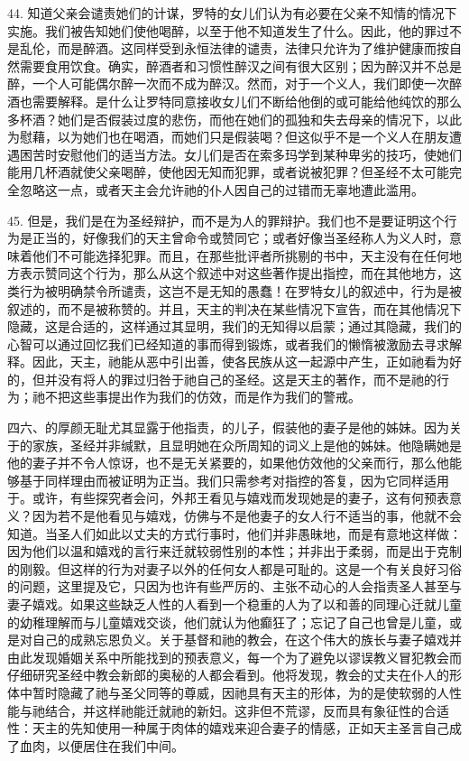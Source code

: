 44. 知道父亲会谴责她们的计谋，罗特的女儿们认为有必要在父亲不知情的情况下实施。我们被告知她们使他喝醉，以至于他不知道发生了什么。因此，他的罪过不是乱伦，而是醉酒。这同样受到永恒法律的谴责，法律只允许为了维护健康而按自然需要食用饮食。确实，醉酒者和习惯性醉汉之间有很大区别；因为醉汉并不总是醉，一个人可能偶尔醉一次而不成为醉汉。然而，对于一个义人，我们即使一次醉酒也需要解释。是什么让罗特同意接收女儿们不断给他倒的或可能给他纯饮的那么多杯酒？她们是否假装过度的悲伤，而他在她们的孤独和失去母亲的情况下，以此为慰藉，以为她们也在喝酒，而她们只是假装喝？但这似乎不是一个义人在朋友遭遇困苦时安慰他们的适当方法。女儿们是否在索多玛学到某种卑劣的技巧，使她们能用几杯酒就使父亲喝醉，使他因无知而犯罪，或者说被犯罪？但圣经不太可能完全忽略这一点，或者天主会允许祂的仆人因自己的过错而无辜地遭此滥用。\par

45. 但是，我们是在为圣经辩护，而不是为人的罪辩护。我们也不是要证明这个行为是正当的，好像我们的天主曾命令或赞同它；或者好像当圣经称人为义人时，意味着他们不可能选择犯罪。而且，在那些批评者所挑剔的书中，天主没有在任何地方表示赞同这个行为，那么从这个叙述中对这些著作提出指控，而在其他地方，这类行为被明确禁令所谴责，这岂不是无知的愚蠢！在罗特女儿的叙述中，行为是被叙述的，而不是被称赞的。并且，天主的判决在某些情况下宣告，而在其他情况下隐藏，这是合适的，这样通过其显明，我们的无知得以启蒙；通过其隐藏，我们的心智可以通过回忆我们已经知道的事而得到锻炼，或者我们的懒惰被激励去寻求解释。因此，天主，祂能从恶中引出善，使各民族从这一起源中产生，正如祂看为好的，但并没有将人的罪过归咎于祂自己的圣经。这是天主的著作，而不是祂的行为；祂不把这些事提出作为我们的仿效，而是作为我们的警戒。\par

四六、的厚颜无耻尤其显露于他指责，的儿子，假装他的妻子是他的姊妹。因为关于的家族，圣经并非缄默，且显明她在众所周知的词义上是他的姊妹。他隐瞒她是他的妻子并不令人惊讶，也不是无关紧要的，如果他仿效他的父亲而行，那么他能够基于同样理由而被证明为正当。我们只需参考对指控的答复，因为它同样适用于。或许，有些探究者会问，外邦王看见与嬉戏而发现她是的妻子，这有何预表意义？因为若不是他看见与嬉戏，仿佛与不是他妻子的女人行不适当的事，他就不会知道。当圣人们如此以丈夫的方式行事时，他们并非愚昧地，而是有意地这样做：因为他们以温和嬉戏的言行来迁就较弱性别的本性；并非出于柔弱，而是出于克制的刚毅。但这样的行为对妻子以外的任何女人都是可耻的。这是一个有关良好习俗的问题，这里提及它，只因为也许有些严厉的、主张不动心的人会指责圣人甚至与妻子嬉戏。如果这些缺乏人性的人看到一个稳重的人为了以和善的同理心迁就儿童的幼稚理解而与儿童嬉戏交谈，他们就认为他癫狂了；忘记了自己也曾是儿童，或是对自己的成熟忘恩负义。关于基督和祂的教会，在这个伟大的族长与妻子嬉戏并由此发现婚姻关系中所能找到的预表意义，每一个为了避免以谬误教义冒犯教会而仔细研究圣经中教会新郎的奥秘的人都会看到。他将发现，教会的丈夫在仆人的形体中暂时隐藏了祂与圣父同等的尊威，因祂具有天主的形体，为的是使软弱的人性能与祂结合，并这样祂能迁就祂的新妇。这非但不荒谬，反而具有象征性的合适性：天主的先知使用一种属于肉体的嬉戏来迎合妻子的情感，正如天主圣言自己成了血肉，以便居住在我们中间。\par

